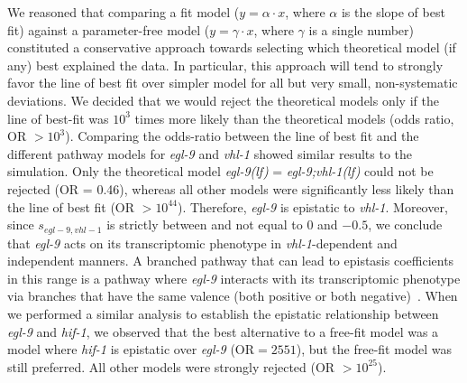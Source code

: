 \documentclass[9pt,twocolumn,twoside]{pnas-new}
\newcommand{\gene}[1]{\emph{#1}}
\newcommand{\egl}{\emph{egl-9(lf)}}
\newcommand{\eglvhl}{\emph{egl-9;vhl-1(lf)}}
\begin{document}
We reasoned that comparing a fit model ($y = \alpha\cdot x$, where $\alpha$ is
the slope of best fit) against a parameter-free model ($y = \gamma\cdot x$,
where $\gamma$ is a single number) constituted a conservative approach towards
selecting which theoretical model (if any) best explained the data. In particular,
this approach will tend to strongly favor the line of best fit over simpler model
for all but very small, non-systematic deviations. We decided
that we would reject the theoretical models only if the line of best-fit
was $10^3$ times more likely than the theoretical models (odds ratio, OR $>10^3$).
Comparing the odds-ratio between the line of best fit and the different pathway
models for \gene{egl-9} and \gene{vhl-1} showed similar results to the simulation.
Only the theoretical model \egl{} = \eglvhl{} could not be rejected (OR = 0.46),
whereas all other models were significantly less likely than the line of best fit
(OR $>10^{44}$).
Therefore, \gene{egl-9} is epistatic to \gene{vhl-1}. Moreover,
since $s_{egl-9, vhl-1}$ is strictly between and not equal to $0$ and $-0.5$, we
conclude that \gene{egl-9} acts on its transcriptomic phenotype in
\gene{vhl-1}-dependent and independent manners. A branched pathway that can lead
to epistasis coefficients in this range is a pathway where \gene{egl-9} interacts
with its transcriptomic phenotype via branches that have the same valence (both
positive or both negative)~\cite{Shao2009}. When we performed a similar analysis
to establish the epistatic relationship between \gene{egl-9} and \gene{hif-1},
we observed that the best alternative to a free-fit model was a model where
\gene{hif-1} is epistatic over \gene{egl-9} (OR$=2551$), but the free-fit model
was still preferred. All other models were strongly rejected (OR $>10^{25}$).
\end{document}
